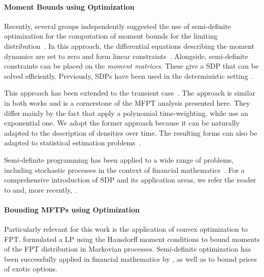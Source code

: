 \paragraph{Moment Bounds using Optimization} Recently, several groups independently suggested the use of semi-definite
optimization for the computation of moment bounds for the limiting
distribution~\parencite{ghusinga2017exact,dowdy2018bounds,kuntz2017rigorous,sakurai2017convex}.
In this approach, the differential equations describing the moment dynamics are
set to zero and form linear constraints~\parencite{backenkohler2018moment}. Alongside, semi-definite constraints can
be placed on the \emph{moment matrices}. These give a \acf{SDP}
that can be solved efficiently.
Previously, \acp{SDP} have been used in the deterministic setting \parencite{hasenauer2009guaranteed}.

This approach has been extended to the transient
case~\parencite{dowdy2018dynamic,sakurai2019bounding}.
The approach is similar in both works and is a cornerstone of the \ac{MFPT} analysis
presented here.
They differ mainly by the fact that \citet{sakurai2019bounding} apply a polynomial
time-weighting, while \citet{dowdy2018dynamic} use an
exponential one. We adopt the former approach because it
can be naturally adapted to the description of densities over time.
The resulting forms can also be adapted to statistical estimation
problems~\parencite{backenkohler2019control}.

Semi-definite programming has been applied to a wide range of problems,
including stochastic processes in the context of financial
mathematics~\parencite{lasserre2006pricing,kashima2009polynomial}.
For a comprehensive introduction of \ac{SDP} and its application areas, we refer
the reader to \citet{parrilo2003semidefinite} and, more recently,
\citet{lasserre2010moments}.

\paragraph{Bounding MFTPs using Optimization}
Particularly relevant for this work is the application of convex optimization to
\ac{FPT}\@.
\citet{helmes2001computing} formulated a \ac{LP} using the
Hausdorff moment conditions \parencite{hausdorff} to bound moments of the
\ac{FPT} distribution in Markovian processes.
Semi-definite optimization has been successfully applied in financial
mathematics by \citet{kashima2009polynomial}, as well as
\citet{lasserre2006pricing} to bound prices of exotic options.

